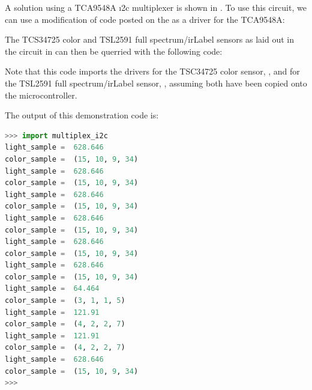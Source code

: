 A solution using a TCA9548A \i2c multiplexer is shown in .
To use this circuit, we can use a modification of code posted on the  as a driver for the TCA9548A:

% 

The TCS34725 color and TSL2591 full spectrum/\gls{irLabel} sensors as laid out in the circuit in  can then be querried with the following code:


Note that this code imports the drivers for the TSC34725 color sensor, , and for the TSL2591 full spectrum/\gls{irLabel} sensor, , assuming both have been copied onto the microcontroller.

The output of this demonstration code is:
\begin{lstlisting}[language=Python]
>>> import multiplex_i2c
light_sample =  628.646
color_sample =  (15, 10, 9, 34)
light_sample =  628.646
color_sample =  (15, 10, 9, 34)
light_sample =  628.646
color_sample =  (15, 10, 9, 34)
light_sample =  628.646
color_sample =  (15, 10, 9, 34)
light_sample =  628.646
color_sample =  (15, 10, 9, 34)
light_sample =  628.646
color_sample =  (15, 10, 9, 34)
light_sample =  64.464
color_sample =  (3, 1, 1, 5)
light_sample =  121.91
color_sample =  (4, 2, 2, 7)
light_sample =  121.91
color_sample =  (4, 2, 2, 7)
light_sample =  628.646
color_sample =  (15, 10, 9, 34)
>>>
\end{lstlisting}

